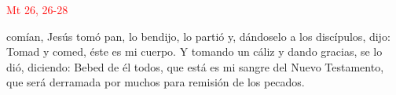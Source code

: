 \hfill\textcolor{red}{Mt 26, 26-28}

comían, Jesús tomó pan, lo bendijo, lo partió y, dándoselo a los discípulos, dijo: Tomad y comed, éste es mi cuerpo. Y tomando un cáliz y dando gracias,
se lo dió, diciendo: Bebed de él todos, que está es mi sangre del Nuevo Testamento, que será derramada por muchos para remisión de los pecados.